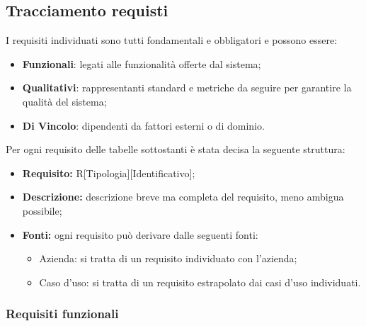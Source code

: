 \subsection{Tracciamento requisti}
I requisiti individuati sono tutti fondamentali e obbligatori e possono essere:
\begin{itemize}
	\item \textbf{Funzionali}: legati alle funzionalità offerte dal sistema;
	\item \textbf{Qualitativi}: rappresentanti standard e metriche da seguire per garantire la qualità del sistema;
	\item \textbf{Di Vincolo}: dipendenti da fattori esterni o di dominio.
\end{itemize}
Per ogni requisito delle tabelle sottostanti è stata decisa la seguente struttura: 
\begin{itemize}
	\item\textbf{Requisito:} R[Tipologia][Identificativo];
	\item\textbf{Descrizione:} descrizione breve ma completa del requisito, meno ambigua possibile;
	\item\textbf{Fonti:} ogni requisito può derivare dalle seguenti fonti:
	\begin{itemize}
		\item Azienda: si tratta di un requisito individuato con l'azienda;
		\item Caso d'uso: si tratta di un requisito estrapolato dai casi d'uso individuati.
	\end{itemize}
\end{itemize}

\subsubsection{Requisiti funzionali}

